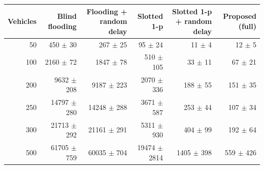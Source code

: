 \scriptsize
\renewcommand{\arraystretch}{1.2}
\begin{tabular}{rrrrrr}
\toprule
Vehicles & Blind flooding & Flooding + random delay & Slotted 1-p & Slotted 1-p + random delay & Proposed (full) \\
\midrule
50 & 450 $\pm$ 30 & 267 $\pm$ 25 & 95 $\pm$ 24 & 11 $\pm$ 4 & 12 $\pm$ 5 \\
100 & 2160 $\pm$ 72 & 1847 $\pm$ 78 & 510 $\pm$ 105 & 33 $\pm$ 11 & 67 $\pm$ 21 \\
200 & 9632 $\pm$ 208 & 9187 $\pm$ 223 & 2070 $\pm$ 336 & 188 $\pm$ 55 & 151 $\pm$ 35 \\
250 & 14797 $\pm$ 280 & 14248 $\pm$ 288 & 3671 $\pm$ 587 & 253 $\pm$ 44 & 107 $\pm$ 34 \\
300 & 21713 $\pm$ 292 & 21161 $\pm$ 291 & 5311 $\pm$ 930 & 404 $\pm$ 99 & 192 $\pm$ 64 \\
500 & 61705 $\pm$ 759 & 60035 $\pm$ 704 & 19474 $\pm$ 2814 & 1405 $\pm$ 398 & 559 $\pm$ 426 \\
\bottomrule
\end{tabular}
